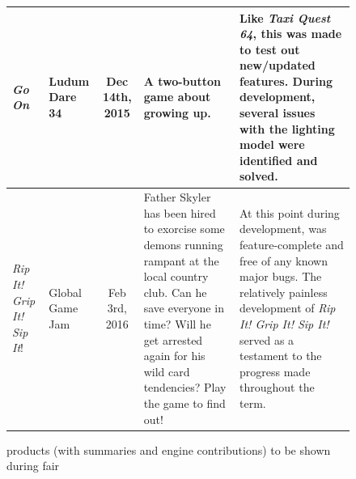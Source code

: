 \documentclass{GlobalDocument}
\begin{document}
\begin{figure}[htb]
\begin{tabular}{ | p{3cm} | p{3cm} | c | p{5.5cm} | p{6cm} |}
    \textit{Go On}&
    Ludum Dare 34&
    Dec 14th, 2015&
    A two-button game about growing up.&
    Like \textit{Taxi Quest 64}, this was made to test out new/updated features. During development, several issues with the lighting model were identified and solved.\\ \hline
    
    \textit{Rip It! Grip It! Sip It}! &
    Global Game Jam&
    Feb 3rd, 2016&
    Father Skyler has been hired to exorcise some demons running rampant at the local country club. Can he save everyone in time? Will he get arrested again for his wild card tendencies? Play the game to find out! &
    At this point during development, \ourengine{} was feature-complete and free of any known major bugs. The relatively painless development of \textit{Rip It! Grip It! Sip It!} served as a testament to the progress made throughout the term.\\ \hline
    
    \end{tabular}
\caption{\ourengine{} products (with summaries and engine contributions) to be shown during fair}
\label{table:products}
\end{figure}
\end{document}
